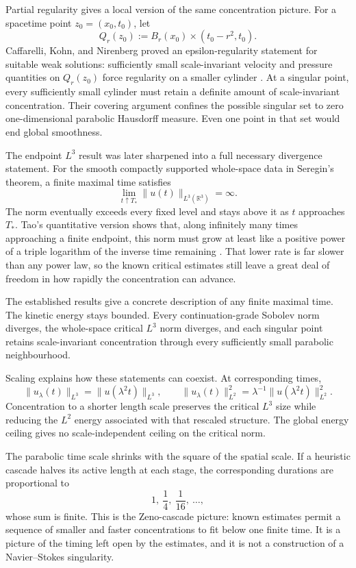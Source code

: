 Partial regularity gives a local version of the same concentration picture.
For a spacetime point \(z_0=(x_0,t_0)\), let
\[
  Q_r(z_0)
  :=
  B_r(x_0)\times(t_0-r^2,t_0).
\]
Caffarelli, Kohn, and Nirenberg proved an epsilon-regularity statement for suitable weak solutions: sufficiently small scale-invariant velocity and pressure quantities on \(Q_r(z_0)\) force regularity on a smaller cylinder \parencite{CaffarelliKohnNirenberg1982}.
At a singular point, every sufficiently small cylinder must retain a definite amount of scale-invariant concentration.
Their covering argument confines the possible singular set to zero one-dimensional parabolic Hausdorff measure.
Even one point in that set would end global smoothness.

The endpoint \(L^3\) result was later sharpened into a full necessary divergence statement.
For the smooth compactly supported whole-space data in Seregin's theorem, a finite maximal time satisfies \parencite{Seregin2012}
\[
  \lim_{t\uparrow T_*}
  \lVert u(t)\rVert_{L^3(\mathbb R^3)}
  =
  \infty.
\]
The norm eventually exceeds every fixed level and stays above it as \(t\) approaches \(T_*\).
Tao's quantitative version shows that, along infinitely many times approaching a finite endpoint, this norm must grow at least like a positive power of a triple logarithm of the inverse time remaining \parencite{Tao2021Quantitative}.
That lower rate is far slower than any power law, so the known critical estimates still leave a great deal of freedom in how rapidly the concentration can advance.


The established results give a concrete description of any finite maximal time.
The kinetic energy stays bounded.
Every continuation-grade Sobolev norm diverges, the whole-space critical \(L^3\) norm diverges, and each singular point retains scale-invariant concentration through every sufficiently small parabolic neighbourhood.

Scaling explains how these statements can coexist.
At corresponding times,
\[
  \lVert u_\lambda(t)\rVert_{L^3}
  =
  \lVert u(\lambda^2t)\rVert_{L^3},
  \qquad
  \lVert u_\lambda(t)\rVert_{L^2}^{2}
  =
  \lambda^{-1}
  \lVert u(\lambda^2t)\rVert_{L^2}^{2}.
\]
Concentration to a shorter length scale preserves the critical \(L^3\) size while reducing the \(L^2\) energy associated with that rescaled structure.
The global energy ceiling gives no scale-independent ceiling on the critical norm.

The parabolic time scale shrinks with the square of the spatial scale.
If a heuristic cascade halves its active length at each stage, the corresponding durations are proportional to
\[
  1,\ \frac14,\ \frac1{16},\ \ldots,
\]
whose sum is finite.
This is the Zeno-cascade picture: known estimates permit a sequence of smaller and faster concentrations to fit below one finite time.
It is a picture of the timing left open by the estimates, and it is not a construction of a Navier--Stokes singularity.

